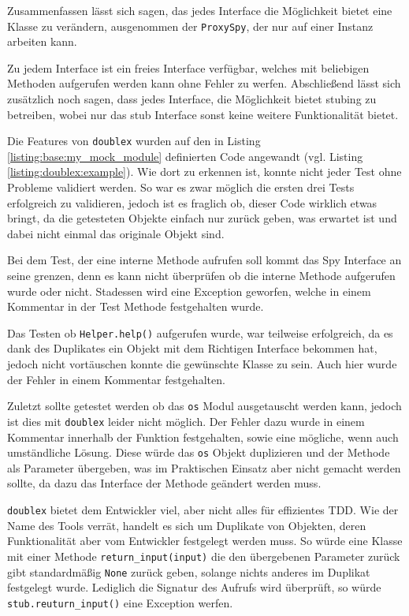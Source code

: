 Zusammenfassen lässt sich sagen, das jedes Interface die Möglichkeit bietet eine
Klasse zu verändern, ausgenommen der \lstinline{ProxySpy}, der nur auf einer
Instanz arbeiten kann.

Zu jedem Interface ist ein freies Interface verfügbar, welches mit beliebigen
Methoden aufgerufen werden kann ohne Fehler zu werfen. Abschließend lässt sich
zusätzlich noch sagen, dass jedes Interface, die Möglichkeit bietet
\gls{stub}ing zu betreiben, wobei nur das \Gls{stub} Interface sonst keine
weitere Funktionalität bietet.
\newline

Die Features von \lstinline{doublex} wurden auf den in Listing
\ref{listing:base:my_mock_module} definierten Code angewandt (vgl. Listing
\ref{listing:doublex:example}). Wie dort zu erkennen ist, konnte nicht jeder
Test ohne Probleme validiert werden. So war es zwar möglich die ersten drei
Tests erfolgreich zu validieren, jedoch ist es fraglich ob, dieser Code
wirklich etwas bringt, da die getesteten Objekte einfach nur zurück geben, was
erwartet ist und dabei nicht einmal das originale Objekt sind.

Bei dem Test, der eine interne Methode aufrufen soll kommt das Spy Interface an
seine grenzen, denn es kann nicht überprüfen ob die interne Methode aufgerufen
wurde oder nicht. Stadessen wird eine Exception geworfen, welche in einem
Kommentar in der Test Methode festgehalten wurde.

Das Testen ob \lstinline{Helper.help()} aufgerufen wurde, war teilweise
erfolgreich, da es dank des Duplikates ein Objekt mit dem Richtigen Interface
bekommen hat, jedoch nicht vortäuschen konnte die gewünschte Klasse zu sein.
Auch hier wurde der Fehler in einem Kommentar festgehalten.

Zuletzt sollte getestet werden ob das \lstinline{os} Modul ausgetauscht werden
kann, jedoch ist dies mit \lstinline{doublex} leider nicht möglich. Der Fehler
dazu wurde in einem Kommentar innerhalb der Funktion festgehalten, sowie eine
mögliche, wenn auch umständliche Lösung.
Diese würde das \lstinline{os} Objekt duplizieren und der Methode als
Parameter übergeben, was im Praktischen Einsatz aber nicht gemacht werden
sollte, da dazu das Interface der Methode geändert werden muss.
\newline

\lstinline{doublex} bietet dem Entwickler viel, aber nicht alles für effizientes
TDD. Wie der Name des Tools verrät, handelt es sich um Duplikate von Objekten,
deren Funktionalität aber vom Entwickler festgelegt werden muss. So würde eine
Klasse mit einer Methode \lstinline{return_input(input)} die den übergebenen
Parameter zurück gibt standardmäßig \lstinline{None} zurück geben, solange
nichts anderes im Duplikat festgelegt wurde. Lediglich die Signatur des Aufrufs
wird überprüft, so würde \lstinline{stub.reuturn_input()} eine Exception
werfen.

